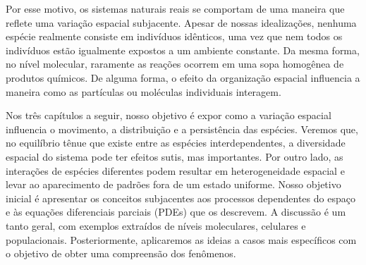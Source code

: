 {{Por esse motivo, os sistemas naturais reais se comportam de uma maneira que reflete uma variação espacial subjacente. Apesar de nossas idealizações, nenhuma espécie realmente consiste em indivíduos idênticos, uma vez que nem todos os indivíduos estão igualmente expostos a um ambiente constante. Da mesma forma, no nível molecular, raramente as reações ocorrem em uma sopa homogênea de produtos químicos. De alguma forma, o efeito da organização espacial influencia a maneira como as partículas ou moléculas individuais interagem.}}

{{Nos três capítulos a seguir, nosso objetivo é expor como a variação espacial influencia o movimento, a distribuição e a persistência das espécies. Veremos que, no equilíbrio tênue que existe entre as espécies interdependentes, a diversidade espacial do sistema pode ter efeitos sutis, mas importantes. Por outro lado, as interações de espécies diferentes podem resultar em heterogeneidade espacial e levar ao aparecimento de padrões fora de um estado uniforme. Nosso objetivo inicial é apresentar os conceitos subjacentes aos processos dependentes do espaço e às equações diferenciais parciais (PDEs) que os descrevem. A discussão é um tanto geral, com exemplos extraídos de níveis moleculares, celulares e populacionais. Posteriormente, aplicaremos as ideias a casos mais específicos com o objetivo de obter uma compreensão dos fenômenos.}}

